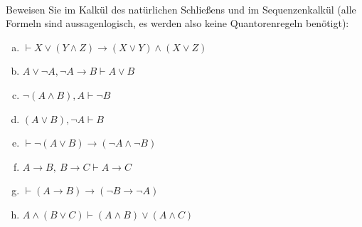 \newcommand{\printpraesenzlsg}{false}
\newcommand{\printloesungen}{true}
\newcommand{\printbewertungen}{false}
\newcommand{\blattnummer}{4}

\usepackage{bussproofs}

\iforiginal{}

	



\\

Beweisen Sie im Kalkül des natürlichen Schließens und im Sequenzenkalkül (alle Formeln sind aussagenlogisch, es werden also keine Quantorenregeln benötigt):
\begin{enumerate}[a)]
  \item $\vdash X\vee(Y\wedge Z)\to(X\vee Y)\wedge(X\vee Z)$
  \item $A\vee\neg A, \neg A\to B\vdash A\vee B$
  \item $\neg (A\wedge B), A\vdash\neg B$
  \item $(A\vee B),\neg A\vdash B$
  \item $\vdash\neg(A\vee B)\to(\neg A\wedge\neg B)$
  \item $A\to B,\ B\to C\vdash A\to C$
  \item $\vdash (A\to B)\to(\neg B\to\neg A)$
  \item $A\wedge(B\vee C)\vdash (A\wedge B)\vee(A\wedge C)$
\end{enumerate}

